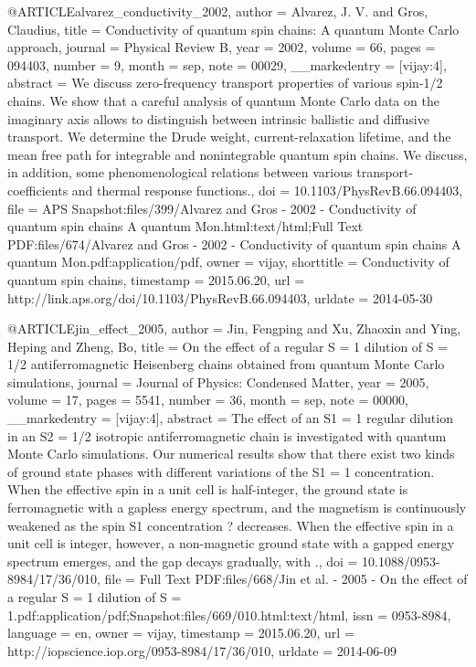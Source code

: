@ARTICLE{alvarez_conductivity_2002,
  author = {Alvarez, J. V. and Gros, Claudius},
  title = {Conductivity of quantum spin chains: {A} quantum {Monte} {Carlo}
	approach},
  journal = {Physical Review B},
  year = {2002},
  volume = {66},
  pages = {094403},
  number = {9},
  month = sep,
  note = {00029},
  __markedentry = {[vijay:4]},
  abstract = {We discuss zero-frequency transport properties of various spin-1/2
	chains. We show that a careful analysis of quantum Monte Carlo data
	on the imaginary axis allows to distinguish between intrinsic ballistic
	and diffusive transport. We determine the Drude weight, current-relaxation
	lifetime, and the mean free path for integrable and nonintegrable
	quantum spin chains. We discuss, in addition, some phenomenological
	relations between various transport-coefficients and thermal response
	functions.},
  doi = {10.1103/PhysRevB.66.094403},
  file = {APS Snapshot:files/399/Alvarez and Gros - 2002 - Conductivity of quantum spin chains A quantum Mon.html:text/html;Full Text PDF:files/674/Alvarez and Gros - 2002 - Conductivity of quantum spin chains A quantum Mon.pdf:application/pdf},
  owner = {vijay},
  shorttitle = {Conductivity of quantum spin chains},
  timestamp = {2015.06.20},
  url = {http://link.aps.org/doi/10.1103/PhysRevB.66.094403},
  urldate = {2014-05-30}
}

@ARTICLE{jin_effect_2005,
  author = {Jin, Fengping and Xu, Zhaoxin and Ying, Heping and Zheng, Bo},
  title = {On the effect of a regular {S} = 1 dilution of {S} = 1/2 antiferromagnetic
	{Heisenberg} chains obtained from quantum {Monte} {Carlo} simulations},
  journal = {Journal of Physics: Condensed Matter},
  year = {2005},
  volume = {17},
  pages = {5541},
  number = {36},
  month = sep,
  note = {00000},
  __markedentry = {[vijay:4]},
  abstract = {The effect of an S1 = 1 regular dilution in an S2 = 1/2 isotropic
	antiferromagnetic chain is investigated with quantum Monte Carlo
	simulations. Our numerical results show that there exist two kinds
	of ground state phases with different variations of the S1 = 1 concentration.
	When the effective spin in a unit cell is half-integer, the ground
	state is ferromagnetic with a gapless energy spectrum, and the magnetism
	is continuously weakened as the spin S1 concentration ? decreases.
	When the effective spin in a unit cell is integer, however, a non-magnetic
	ground state with a gapped energy spectrum emerges, and the gap decays
	gradually, with .},
  doi = {10.1088/0953-8984/17/36/010},
  file = {Full Text PDF:files/668/Jin et al. - 2005 - On the effect of a regular S = 1 dilution of S = 1.pdf:application/pdf;Snapshot:files/669/010.html:text/html},
  issn = {0953-8984},
  language = {en},
  owner = {vijay},
  timestamp = {2015.06.20},
  url = {http://iopscience.iop.org/0953-8984/17/36/010},
  urldate = {2014-06-09}
}

